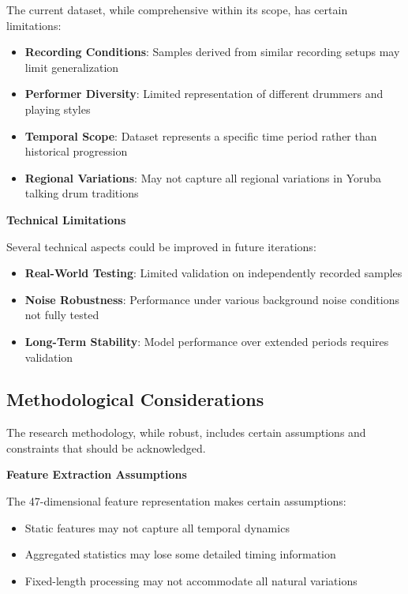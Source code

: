 \documentclass[12pt,a4paper]{article}
\begin{document}
The current dataset, while comprehensive within its scope, has certain limitations:

\begin{itemize}
\item \textbf{Recording Conditions}: Samples derived from similar recording setups may limit generalization
\item \textbf{Performer Diversity}: Limited representation of different drummers and playing styles
\item \textbf{Temporal Scope}: Dataset represents a specific time period rather than historical progression
\item \textbf{Regional Variations}: May not capture all regional variations in Yoruba talking drum traditions
\end{itemize}

\textbf{Technical Limitations}

Several technical aspects could be improved in future iterations:

\begin{itemize}
\item \textbf{Real-World Testing}: Limited validation on independently recorded samples
\item \textbf{Noise Robustness}: Performance under various background noise conditions not fully tested
\item \textbf{Long-Term Stability}: Model performance over extended periods requires validation
\end{itemize}

\subsection{Methodological Considerations}

The research methodology, while robust, includes certain assumptions and constraints that should be acknowledged.

\textbf{Feature Extraction Assumptions}

The 47-dimensional feature representation makes certain assumptions:

\begin{itemize}
\item Static features may not capture all temporal dynamics
\item Aggregated statistics may lose some detailed timing information
\item Fixed-length processing may not accommodate all natural variations
\end{itemize}
\end{document}
